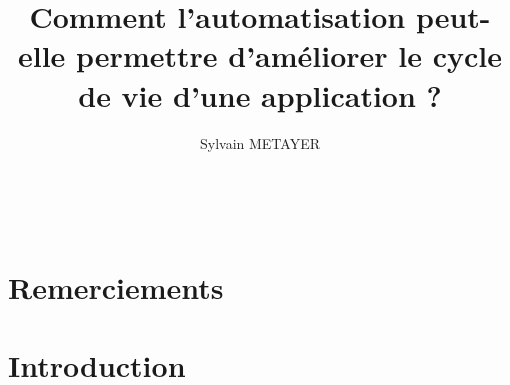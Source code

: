 \documentclass[11pt,a4paper,twoside]{article}
\title{Comment l'automatisation peut-elle permettre d'améliorer le cycle de vie d'une application ?}
\author{Sylvain METAYER}
\begin{document}
	\pagestyle{plain} %
	 
\newpage
	~ %
\newpage
	\iftoggle{todoExplain}{%
		\section*{Détails des couleurs todo}
		\begin{itemize}
			\item \emph{gray} est utilisé pour les parties obligatoires, mais non relative au contenu pur du mémoire (remerciements, abstract...)
			\item \emph{red} est utilisé pour les todos nécessitant de la recherche et de la rédaction.
			\item \emph{orange} est utilisé pour les parties nécessitant des refonte, soit sur la forme, soit parce qu'elle doivent être liées à d'autres parties.
			\item \emph{cyan} est utilisé pour les parties nécessitant de la rédaction sans recherche.
			\item \emph{yellow} est utilisé pour des estimations de nombre de page que la partie est \emph{censée} occuper.
		\end{itemize}
	}{}
	\listoftodos 
\newpage
	\section*{Remerciements}
	
\newpage

\newpage
\newpage
	\pagenumbering{\numerotationType} %
	
\newpage
	
\newpage
	\section*{Introduction}
	
\newpage
	\pagestyle{fancy}
\end{document}
